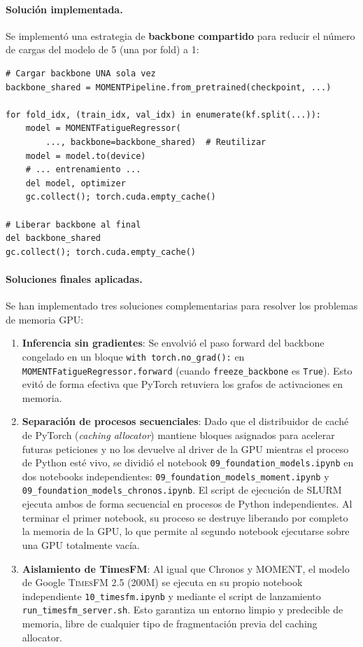 \documentclass[12pt, a4paper]{article}
\newcommand{\code}[1]{\texttt{#1}}
\newcommand{\timesfm}{\textsc{TimesFM}}
\begin{document}
\paragraph{Solución implementada.}
Se implementó una estrategia de \textbf{backbone compartido} para reducir el número de cargas del modelo de 5 (una por fold) a 1:
\begin{lstlisting}[caption={Backbone compartido en finetune\_moment\_kfold.}]
# Cargar backbone UNA sola vez
backbone_shared = MOMENTPipeline.from_pretrained(checkpoint, ...)

for fold_idx, (train_idx, val_idx) in enumerate(kf.split(...)):
    model = MOMENTFatigueRegressor(
        ..., backbone=backbone_shared)  # Reutilizar
    model = model.to(device)
    # ... entrenamiento ...
    del model, optimizer
    gc.collect(); torch.cuda.empty_cache()

# Liberar backbone al final
del backbone_shared
gc.collect(); torch.cuda.empty_cache()
\end{lstlisting}

\paragraph{Soluciones finales aplicadas.}
Se han implementado tres soluciones complementarias para resolver los problemas de memoria GPU:
\begin{enumerate}
    \item \textbf{Inferencia sin gradientes}: Se envolvió el paso forward del backbone congelado en un bloque \code{with torch.no\_grad():} en \code{MOMENTFatigueRegressor.forward} (cuando \code{freeze\_backbone} es \code{True}). Esto evitó de forma efectiva que PyTorch retuviera los grafos de activaciones en memoria.
    \item \textbf{Separación de procesos secuenciales}: Dado que el distribuidor de caché de PyTorch (\textit{caching allocator}) mantiene bloques asignados para acelerar futuras peticiones y no los devuelve al driver de la GPU mientras el proceso de Python esté vivo, se dividió el notebook \code{09\_foundation\_models.ipynb} en dos notebooks independientes: \code{09\_foundation\_models\_moment.ipynb} y \code{09\_foundation\_models\_chronos.ipynb}. El script de ejecución de SLURM ejecuta ambos de forma secuencial en procesos de Python independientes. Al terminar el primer notebook, su proceso se destruye liberando por completo la memoria de la GPU, lo que permite al segundo notebook ejecutarse sobre una GPU totalmente vacía.
    \item \textbf{Aislamiento de TimesFM}: Al igual que Chronos y MOMENT, el modelo de Google \timesfm{} 2.5 (200M) se ejecuta en su propio notebook independiente \code{10\_timesfm.ipynb} y mediante el script de lanzamiento \code{run\_timesfm\_server.sh}. Esto garantiza un entorno limpio y predecible de memoria, libre de cualquier tipo de fragmentación previa del caching allocator.
\end{enumerate}
\end{document}
